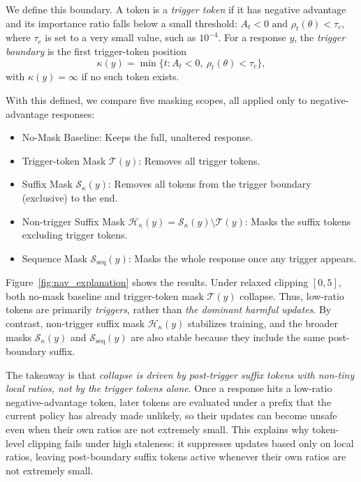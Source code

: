 We define this boundary. A token is a \textit{trigger token}
if it has negative advantage and its importance ratio falls below a small
threshold:
$A_t<0\text{ and }\rho_t(\theta)<\tau_c ,
$
where $\tau_c$ is set to a very small value, such as $10^{-4}$. For a response
$y$, the \textit{trigger boundary} is the first trigger-token position
\begin{equation}
    \kappa(y)=\min\{t: A_t<0,\ \rho_t(\theta)<\tau_c\},
\end{equation}
with $\kappa(y)=\infty$ if no such token exists.

With this defined, we compare five masking scopes, all applied only to
negative-advantage responses:
\begin{itemize}
[leftmargin=*,noitemsep,topsep=0pt]
\vspace{-5pt}
    \item No-Mask Baseline: Keeps the full, unaltered response.
    \item Trigger-token Mask $\mathcal{T}(y)$: Removes all trigger tokens.
    \item Suffix Mask $\mathcal{S}_{\kappa}(y)$: Removes all tokens from the trigger boundary (exclusive) to the end.
    \item Non-trigger Suffix Mask $\mathcal{H}_{\kappa}(y)= \mathcal S_{\kappa}(y) \setminus \mathcal T(y)$: Masks the suffix tokens excluding trigger tokens.
    \item Sequence Mask $\mathcal{S}_{\mathrm{seq}}(y)$: Masks the whole response once any trigger appears.
\end{itemize}

Figure~\ref{fig:nav_explanation} shows the results. Under relaxed
clipping $[0,5]$, both no-mask baseline and trigger-token mask
$\mathcal T(y)$ collapse.
Thus, low-ratio tokens are primarily  \textit{triggers}, rather than \textit{the dominant harmful updates}.
By contrast, non-trigger suffix mask
$\mathcal H_{\kappa}(y)$ stabilizes training, and the broader masks
$\mathcal S_{\kappa}(y)$ and $\mathcal S_{\mathrm{seq}}(y)$ are also stable
because they include the same post-boundary suffix.

The takeaway is that \textit{collapse is driven by post-trigger suffix tokens with non-tiny local ratios, not by the trigger tokens alone}.
Once a response hits a low-ratio negative-advantage token, later tokens are evaluated under a prefix that the current policy has already made unlikely, so their updates can become unsafe even when their own ratios are not extremely small. 
This explains why token-level clipping fails under high staleness: it suppresses updates based only on local ratios, leaving post-boundary suffix tokens active whenever their own ratios are not extremely small.

